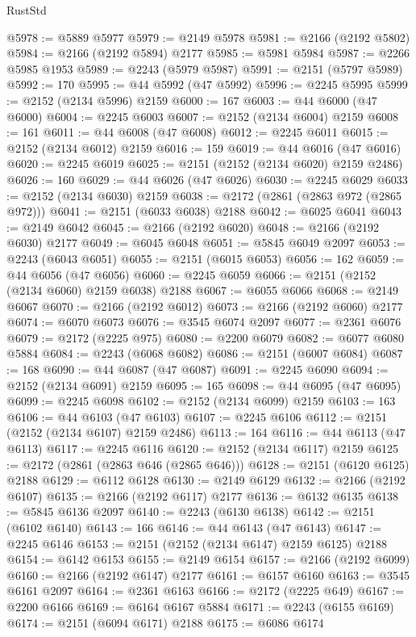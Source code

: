 \begin{lexlean}{RustStd}
\begin{coremodule}
@5978 := @5889 @5977
@5979 := @2149 @5978
@5981 := @2166 (@2192 @5802)
@5984 := @2166 (@2192 @5894) @2177
@5985 := @5981 @5984
@5987 := @2266 @5985 @1953
@5989 := @2243 (@5979 @5987)
@5991 := @2151 (@5797 @5989)
@5992 := 170
@5995 := @44 @5992 (@47 @5992)
@5996 := @2245 @5995
@5999 := @2152 (@2134 @5996) @2159
@6000 := 167
@6003 := @44 @6000 (@47 @6000)
@6004 := @2245 @6003
@6007 := @2152 (@2134 @6004) @2159
@6008 := 161
@6011 := @44 @6008 (@47 @6008)
@6012 := @2245 @6011
@6015 := @2152 (@2134 @6012) @2159
@6016 := 159
@6019 := @44 @6016 (@47 @6016)
@6020 := @2245 @6019
@6025 := @2151 (@2152 (@2134 @6020) @2159 @2486)
@6026 := 160
@6029 := @44 @6026 (@47 @6026)
@6030 := @2245 @6029
@6033 := @2152 (@2134 @6030) @2159
@6038 := @2172 (@2861 (@2863 @972 (@2865 @972)))
@6041 := @2151 (@6033 @6038) @2188
@6042 := @6025 @6041
@6043 := @2149 @6042
@6045 := @2166 (@2192 @6020)
@6048 := @2166 (@2192 @6030) @2177
@6049 := @6045 @6048
@6051 := @5845 @6049 @2097
@6053 := @2243 (@6043 @6051)
@6055 := @2151 (@6015 @6053)
@6056 := 162
@6059 := @44 @6056 (@47 @6056)
@6060 := @2245 @6059
@6066 := @2151 (@2152 (@2134 @6060) @2159 @6038) @2188
@6067 := @6055 @6066
@6068 := @2149 @6067
@6070 := @2166 (@2192 @6012)
@6073 := @2166 (@2192 @6060) @2177
@6074 := @6070 @6073
@6076 := @3545 @6074 @2097
@6077 := @2361 @6076
@6079 := @2172 (@2225 @975)
@6080 := @2200 @6079
@6082 := @6077 @6080 @5884
@6084 := @2243 (@6068 @6082)
@6086 := @2151 (@6007 @6084)
@6087 := 168
@6090 := @44 @6087 (@47 @6087)
@6091 := @2245 @6090
@6094 := @2152 (@2134 @6091) @2159
@6095 := 165
@6098 := @44 @6095 (@47 @6095)
@6099 := @2245 @6098
@6102 := @2152 (@2134 @6099) @2159
@6103 := 163
@6106 := @44 @6103 (@47 @6103)
@6107 := @2245 @6106
@6112 := @2151 (@2152 (@2134 @6107) @2159 @2486)
@6113 := 164
@6116 := @44 @6113 (@47 @6113)
@6117 := @2245 @6116
@6120 := @2152 (@2134 @6117) @2159
@6125 := @2172 (@2861 (@2863 @646 (@2865 @646)))
@6128 := @2151 (@6120 @6125) @2188
@6129 := @6112 @6128
@6130 := @2149 @6129
@6132 := @2166 (@2192 @6107)
@6135 := @2166 (@2192 @6117) @2177
@6136 := @6132 @6135
@6138 := @5845 @6136 @2097
@6140 := @2243 (@6130 @6138)
@6142 := @2151 (@6102 @6140)
@6143 := 166
@6146 := @44 @6143 (@47 @6143)
@6147 := @2245 @6146
@6153 := @2151 (@2152 (@2134 @6147) @2159 @6125) @2188
@6154 := @6142 @6153
@6155 := @2149 @6154
@6157 := @2166 (@2192 @6099)
@6160 := @2166 (@2192 @6147) @2177
@6161 := @6157 @6160
@6163 := @3545 @6161 @2097
@6164 := @2361 @6163
@6166 := @2172 (@2225 @649)
@6167 := @2200 @6166
@6169 := @6164 @6167 @5884
@6171 := @2243 (@6155 @6169)
@6174 := @2151 (@6094 @6171) @2188
@6175 := @6086 @6174

\end{coremodule}
\end{lexlean}
